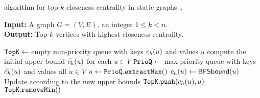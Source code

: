 \begin{algorithm}[tb]
\small
\caption{\small\nbbound algorithm for top-$k$
closeness centrality in static
graphs~\cite{DBLP:journals/tkdd/BergaminiBCMM19}.}
\label{algo:nbbound}
\textbf{Input:} A graph $G = (V, E)$, an integer $1 \le k < n$.\\
\textbf{Output:} Top-$k$ vertices with highest closeness centrality.

\begin{algorithmic}[1]
\State$\texttt{TopK} \gets$ empty min-priority queue with keys $c_h(u)$ and values $u$
\State compute the initial upper bound $\widetilde{c_h}(u)$ for each $u \in V$
\label{line:nbbound-compute-bound}
\State$\texttt{PrioQ} \gets$ max-priority queue with keys $\widetilde{c_h}(u)$ and values all $u\in V$
\label{line:nbbound-prioq-init}
\State$u \gets \texttt{PrioQ}.\texttt{extractMax}()$\label{line:nbbound-extract}
\State\Return\topk\label{line:nbbound-early-stop}
\EndIf
\State$c_h(u) \gets \textsf{BFSbound}(u)$\label{line:nbbound-bfsbound}
\State Update \prioq according to the new upper bounds\label{line:nbbound-update-pq}
\State$\texttt{TopK}.\texttt{push}(c_h(u), u)$\label{line:nbbound-topk-update1}
\State$\texttt{TopK}.\texttt{removeMin}()$\label{line:nbbound-topk-update2}
\EndIf
\EndWhile
\State\Return\topk
\end{algorithmic}
\end{algorithm}

